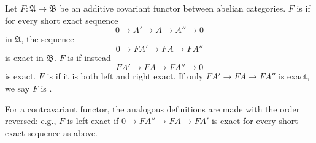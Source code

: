 Let $F: \mathfrak{A} \to \mathfrak{B}$ be an additive covariant functor between abelian categories. $F$ is  if for every short exact sequence
$$0 \to A' \to A \to A'' \to 0$$
in $\mathfrak{A}$, the sequence
$$0 \to F A' \to F A \to F A''$$
is exact in $\mathfrak{B}$. $F$ is  if instead
$$F A' \to F A \to F A'' \to 0$$
is exact. $F$ is  if it is both left and right exact. If only $F A' \to F A \to F A''$ is exact, we say $F$ is .

For a contravariant functor, the analogous definitions are made with the order reversed: e.g., $F$ is left exact if $0 \to F A'' \to F A \to F A'$ is exact for every short exact sequence as above.
